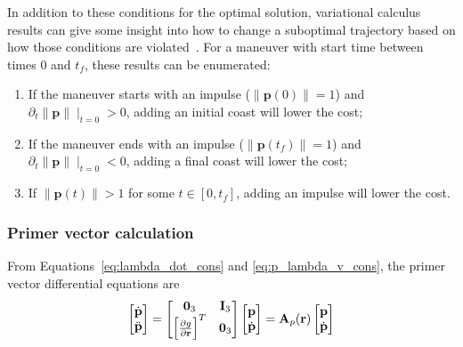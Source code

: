 In addition to these conditions for the optimal solution, variational calculus results can give some insight into how to change a suboptimal trajectory based on how those conditions are violated~\cite{Conway_2010}. For a maneuver with start time between times \(0\) and \(t_f\), these results can be enumerated:
\begin{enumerate}
    \item If the maneuver starts with an impulse (\(\lVert \mathbf{p}(0) \rVert = 1\)) and \(\partial_t \lVert \mathbf{p} \rVert \mid_{t=0} > 0\), adding an initial coast will lower the cost;
    \item If the maneuver ends with an impulse (\(\lVert \mathbf{p}(t_f) \rVert = 1\)) and \(\partial_t \lVert \mathbf{p} \rVert \mid_{t=0} < 0\), adding a final coast will lower the cost;
    \item If \(\lVert \mathbf{p}(t) \rVert > 1\) for some \(t \in [0, t_f]\), adding an impulse will lower the cost.
\end{enumerate}

\subsubsection{Primer vector calculation}\label{sssec:pv_calc_cons}

From Equations~\eqref{eq:lambda_dot_cons} and \eqref{eq:p_lambda_v_cons}, the primer vector differential equations are
\begin{equation}\label{eq:pdot_const}
    \begin{bmatrix}
        \dot{\mathbf{p}} \\ \ddot{\mathbf{p}}
    \end{bmatrix} = \begin{bmatrix}
        \mathbf{0}_3 & \mathbf{I}_3 \\
        \left[\frac{\partial g}{\partial \pos}\right]^T & \mathbf{0}_3
    \end{bmatrix} \begin{bmatrix}
        \mathbf{p} \\ \dot{\mathbf{p}}
    \end{bmatrix} = \mathbf{A}_p(\pos) \begin{bmatrix}
        \mathbf{p} \\ \dot{\mathbf{p}}
    \end{bmatrix}
\end{equation}

